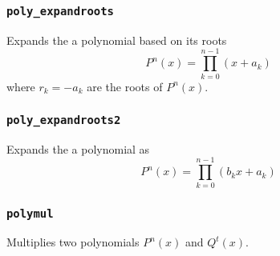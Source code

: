 \subsubsection{{\tt poly\_expandroots}}
Expands the a polynomial based on its roots
\[
    P^n(x) = \prod_{k=0}^{n-1}{(x+a_k)}
\]
where $r_k=-a_k$ are the roots of $P^n(x)$.

\subsubsection{{\tt poly\_expandroots2}}
Expands the a polynomial as
\[
    P^n(x) = \prod_{k=0}^{n-1}{(b_kx+a_k)}
\]

\subsubsection{{\tt polymul}}
Multiplies two polynomials $P^n(x)$ and $Q^t(x)$.

